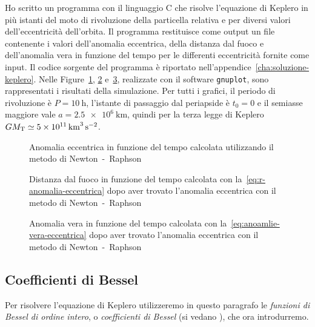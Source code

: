 Ho scritto un programma con il linguaggio C che risolve l'equazione di Keplero
in più istanti del moto di rivoluzione della particella relativa e per diversi
valori dell'eccentricità dell'orbita. Il programma restituisce come output un
file contenente i valori dell'anomalia eccentrica, della distanza dal fuoco e
dell'anomalia vera in funzione del tempo per le differenti eccentricità fornite
come input. Il codice sorgente del programma è riportato
nell'appendice~\ref{cha:soluzione-keplero}. Nelle
Figure~\ref{fig:newton-anomalia_eccentrica}, \ref{fig:newton-raggio}
e~\ref{fig:newton-anomalia_vera}, realizzate con il software \verb|gnuplot|,
sono rappresentati i risultati della simulazione. Per tutti i grafici, il
periodo di rivoluzione è $P = \SI{10}{\hour}$, l'istante di passaggio dal
periapside è $t_0 = 0$ e il semiasse maggiore vale $a =
\SI{2.5e6}{\kilo\metre}$,
quindi per la terza legge di Keplero
$GM_\textup{T} \simeq \SI{5e11}{\cubic\kilo\metre\per\square\second}$.
\begin{figure}
  \centering
  
  \caption[Anomalia eccentrica in funzione del tempo con il metodo di
  Newton~-~Raphson]{Anomalia eccentrica in funzione del tempo calcolata
    utilizzando il metodo di Newton~-~Raphson}
  \label{fig:newton-anomalia_eccentrica}
\end{figure}
\begin{figure}
  \centering
  
  \caption[Distanza dal fuoco in funzione del tempo con il metodo di
  Newton~-~Raphson]{Distanza dal fuoco in funzione del tempo calcolata con
    la~\eqref{eq:r-anomalia-eccentrica} dopo aver trovato l'anomalia eccentrica
    con il metodo di Newton~-~Raphson}
  \label{fig:newton-raggio}
\end{figure}
\begin{figure}
  \centering
  
  \caption[Anomalia vera in funzione del tempo con il metodo di
  Newton~-~Raphson]{Anomalia vera in funzione del tempo calcolata con
    la~\eqref{eq:anoamlie-vera-eccentrica} dopo aver trovato l'anomalia
    eccentrica con il metodo di Newton~-~Raphson}
  \label{fig:newton-anomalia_vera}
\end{figure}

\subsection{Coefficienti di Bessel}
\label{sec:bessel}

Per risolvere l'equazione di Keplero utilizzeremo in questo paragrafo le
\emph{funzioni di Bessel di ordine intero}, o \emph{coefficienti di
  Bessel} (si vedano \textcites{abramowitz:handbook}{watson:bessel}%
{whittaker:modern-analysis}), che ora introdurremo.


